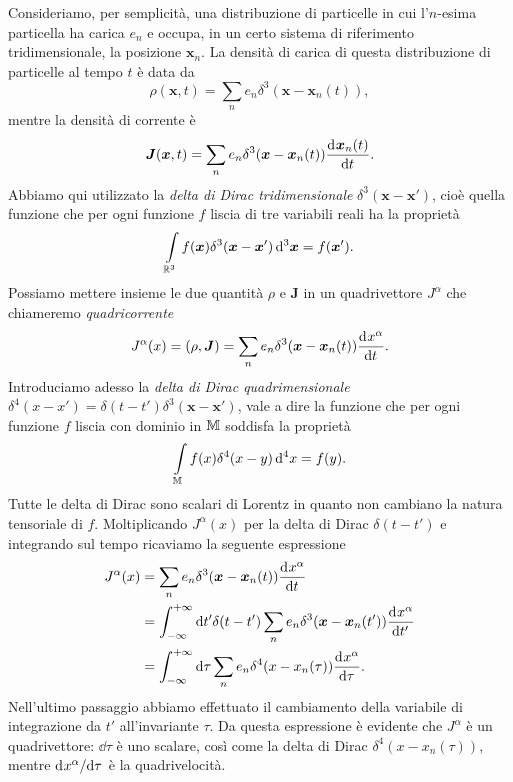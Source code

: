 Consideriamo, per semplicità, una distribuzione di particelle in cui l'$n$-esima
particella ha carica $e_{n}$ e occupa, in un certo sistema di riferimento
tridimensionale, la posizione $\bm{x}_{n}$.  La densità di carica di questa
distribuzione di particelle al tempo $t$ è data da
\begin{equation}
  \rho(\bm{x},t) = \sum_{n} e_{n}\delta^{3}(\bm{x} - \bm{x}_{n}(t)),
\end{equation}
mentre la densità di corrente è
\begin{equation}
  \bm{J}(\bm{x},t) = \sum_{n} e_{n}\delta^{3}(\bm{x} - \bm{x}_{n}(t))
  \frac{{\mathop{}\!\mathrm{d}^{}}\bm{x}_{n}(t)}{\mathop{}\!\mathrm{d} {t}^{}}.
\end{equation}
Abbiamo qui utilizzato la \emph{delta
  di Dirac tridimensionale}
$\delta^{3}(\bm{x} - \bm{x}')$, cioè quella funzione che per ogni funzione $f$
liscia di tre variabili reali ha la proprietà
\begin{equation}
  \int\limits_{\mathbb{R}^{3}} f(\bm{x})\delta^{3}(\bm{x} - \bm{x}') \mathop{}\!\mathrm{d}^{3} \bm{x} =
  f(\bm{x}').
\end{equation}
Possiamo mettere insieme le due quantità $\rho$ e $\bm{J}$ in un quadrivettore
$J^{\alpha}$ che chiameremo \emph{quadricorrente}
\begin{equation}
  J^{\alpha}(x) = (\rho, \bm{J}) = \sum_{n} e_{n}\delta^{3}(\bm{x} -
  \bm{x}_{n}(t)) \frac{{\mathop{}\!\mathrm{d}^{}}x^{\alpha}}{\mathop{}\!\mathrm{d} {t}^{}}.
\end{equation}
Introduciamo adesso la \emph{delta
  di Dirac quadrimensionale}
$\delta^{4}(x - x') = \delta(t - t')\delta^{3}(\bm{x} - \bm{x}')$, vale a dire
la funzione che per ogni funzione $f$ liscia con dominio in $\mathbb{M}$ soddisfa la
proprietà
\begin{equation}
  \int\limits_{\mathbb{M}} f(x)\delta^{4}(x - y)\mathop{}\!\mathrm{d}^{4} x = f(y).
\end{equation}
Tutte le delta di Dirac sono scalari di Lorentz in quanto non cambiano la natura
tensoriale di $f$.  Moltiplicando $J^{\alpha}(x)$ per la delta di Dirac
$\delta(t - t')$ e integrando sul tempo ricaviamo la seguente espressione
\begin{equation}
  \label{eq:quadricorrente}
  \begin{split}
    J^{\alpha}(x) &= \sum_{n} e_{n}\delta^{3}(\bm{x} - \bm{x}_{n}(t))
    \toder{x^{\alpha}}{t} \\
    &= \int_{-\infty}^{+\infty}\dd t' \delta(t - t') \sum_{n}
    e_{n}\delta^{3}(\bm{x} - \bm{x}_{n}(t')) \toder{x^{\alpha}}{t'} \\
    &= \int_{-\infty}^{+\infty} \dd \tau \sum_{n} e_{n} \delta^{4}(x -
    x_{n}(\tau)) \toder{x^{\alpha}}{\tau}.
  \end{split}
\end{equation}
Nell'ultimo passaggio abbiamo effettuato il cambiamento della variabile di
integrazione da $t'$ all'invariante $\tau$.  Da questa espressione è evidente
che $J^{\alpha}$ è un quadrivettore: $\dd \tau$ è uno scalare, così come la
delta di Dirac $\delta^{4}(x - x_{n}(\tau))$, mentre $\mathrm{d}^{}x^{\alpha} / \mathrm{d} {\tau}^{}$
è la quadrivelocità.

